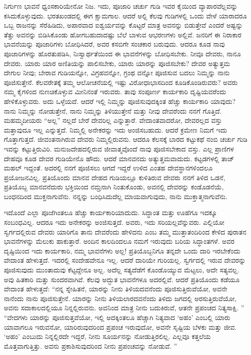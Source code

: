 ನಿರ್ಗುಣ ಭಾವನೆ ಧ್ವಂಸಕಾರಿಯೇನೋ ನಿಜ. ಇದು, ಪೂಜಾರಿ ಚರ್ಚು ಗುಡಿ ಇವರ ಕೈಯಿಂದ ವ್ಯಾಪಾರವೆಲ್ಲವನ್ನು ಕಸಿದುಕೊಳ್ಳುವುದು. ಭರತಖಂಡದಲ್ಲಿ ಈಗ ಕ್ಷಾಮಗಾಲ. ಆದರೆ ಅಲ್ಲಿ ಕೆಲವು ಗುಡಿಗಳಲ್ಲಿ ಒಂದು ವೇಳೆ ಯಾರಾದರೂ ಒಬ್ಬ ರಾಜನನ್ನು ಸೆರೆಹಿಡಿದು, ಅಪಾರವಾದ ಐಶ್ವರ್ಯವನ್ನು ಕೊಟ್ಟರೆ ಮಾತ್ರ ಅವನನ್ನು ಬಿಡುತ್ತೇವೆ ಎಂದರೆ ಅಷ್ಟನ್ನು ತೆತ್ತು ಅವನನ್ನು ಬಿಡಿಸಿಕೊಂಡು ಹೋಗಬಹುದಾದಷ್ಟು ಬೆಲೆ ಬಾಳುವ ಆಭರಣಗಳು ಅಲ್ಲಿವೆ. ಜನರಿಗೆ ಈ ನಿರಾಕಾರ ಭಾವನೆಯನ್ನು ಪೂಜಾರಿಗಳು ಬೋಧಿಸಿದರೆ, ಅವರ ಕಸಬಿಗೇ ಸಂಚಕಾರ ಬರುವುದು. ಆದರೂ ಕೂಡ ನಾವು ಪೂಜಾರಿಗಳನ್ನು ಹೊರತುಪಡಿಸಿ, ನಿಃಸ್ವಾರ್ಥತೆಯಿಂದ ಈ ಭಾವನೆಗಳನ್ನು ಬೋಧಿಸಬೇಕು. ನೀವೂ ದೇವರು, ನಾನೂ ದೇವರು. ಯಾರು ಯಾರ ಅಣಿತಿಯನ್ನು ಪಾಲಿಸಬೇಕು, ಯಾರು ಯಾರನ್ನು ಪೂಜಿಸಬೇಕು? ದೇವರ ಅತ್ಯುತ್ತಮ ದೇಗುಲ ನೀವು; ಬೇರಾವ ಗುಡಿಯನ್ನೋ, ವಿಗ್ರಹವನ್ನೋ, ಗ್ರಂಥ ವನ್ನೋ ಪೂಜಿಸುವ ಬದಲು ನಿಮ್ಮನ್ನು ನಾನು ಪೂಜಿಸುತ್ತೇನೆ. ಕೆಲವರೇತಕ್ಕೆ ತಮ್ಮ ಆಲೋಚನೆಯಲ್ಲಿ ಇಷ್ಟು ವಿರೋಧಾಭಾಸದಿಂದ ಕೂಡಿಕೊಂಡಿರುವರು? ಅವರು ನಮ್ಮ ಕೈಗಳಿಂದ ನುಣಚಿಕೊಳ್ಳುವ ಮೀನಿನಂತೆ ಇರುವರು. ತಾವು ಸಂಪೂರ್ಣ ಕಾರ್ಯಕಾರಿ ದೃಷ್ಟಿಯವರೆಂದು ಹೇಳಿಕೊಳ್ಳುವರು. ಅದು ಒಳ್ಳೆಯದೆ. ಆದರೆ ಇಲ್ಲಿ ನಿಮ್ಮನ್ನು ಪೂಜಿಸುವುದಕ್ಕಿಂತ ಹೆಚ್ಚು ಕಾರ್ಯಕಾರಿ ಯಾವುದು? ನಾನು ನಿಮ್ಮನ್ನು ನೋಡುತ್ತೇನೆ, ನಾನು ನಿಮ್ಮನ್ನು ತಿಳಿಯುತ್ತೇನೆ ಮತ್ತು ನೀವು ದೇವರೆಂದು ನನಗೆ ಗೊತ್ತಿದೆ. ಮಹಮ್ಮದೀಯರು “ಅಲ್ಲ” ನಲ್ಲದೆ ಬೇರೆ ದೇವರಿಲ್ಲ ಎನ್ನುತ್ತಾರೆ. ವೇದಾಂತವಾದರೋ, ದೇವರಲ್ಲದ ವಸ್ತು ಮತ್ತಾವುದೂ ಇಲ್ಲ ಎನ್ನುತ್ತದೆ. ನಿಮ್ಮಲ್ಲಿ ಅನೇಕರನ್ನು ಇದು ಅಂಜಿಸಬಹುದು. ಆದರೆ ಕ್ರಮೇಣ ನಿಮಗೆ ಇದು ಗೊತ್ತಾಗುತ್ತದೆ. ಜೀವಂತನಾಗಿರುವ ದೇವರು ನಿಮ್ಮಲ್ಲಿರುವನು. ಆದರೂ ಕೆಲಸಕ್ಕೆ ಬಾರದ ಕಟ್ಟುಕಥೆ ನಂಬಿ ಚರ್ಚು ಗುಡಿ ಇವನ್ನು ಕಟ್ಟುತ್ತಿರುವಿರಿ. ಮನುಜದೇಹದಲ್ಲಿರುವ ಜೀವಾತ್ಮವೊಂದೆ ನಾವು ಪೂಜಿಸಬೇಕಾದ ವಸ್ತು. ಎಲ್ಲ ಪ್ರಾಣಿಗಳ ದೇಹವೂ ಕೂಡ ದೇವರ ಗುಡಿಯೇನೊ ಹೌದು. ಆದರೆ ಮಾನವನದು ಅತ್ಯುತ್ತಮವಾದುದು. ಕಟ್ಟಡಗಳಲ್ಲಿ ತಾಜ್​ ಮಹಲ್​ ಇದ್ದಂತೆ. ಅದರಲ್ಲಿ ನನಗೆ ಪೂಜಿಸಲು ಆಗದೆ ಇದ್ದರೆ ಉಳಿದ ಎಂತಹ ದೇವಸ್ಥಾನಗಳಿಂದಲೂ ಪ್ರಯೋಜನವಿಲ್ಲ. ಪ್ರತಿಯೊಂದು ಮಾನವ ದೇಹದ ಗುಡಿಯಲ್ಲೂ ಕುಳಿತಿರುವ ದೇವರು ನನಗೆ ತಿಳಿದ ಒಡನೆ, ಪ್ರತಿಯೊಬ್ಬ ಮಾನವನೆದುರು ಭಕ್ತಿಯಿಂದ ನಮ್ರನಾಗಿ ನಿಂತುಕೊಂಡು, ಅವನಲ್ಲಿ ದೇವರನ್ನು ಕಂಡೊಡನೆಯೆ, ಬಂಧನದಿಂದ ಮುಕ್ತನಾಗುವೆನು. ನನ್ನನ್ನು ಬಂಧಿಸಿದುದೆಲ್ಲ ಮಾಯವಾಗುವುದು, ನಾನು ಮುಕ್ತಾತ್ಮನಾಗುವೆನು. 

\vskip 6pt

ಇದೊಂದೆ ಎಲ್ಲಾ ಪೂಜೆಗಿಂತಲೂ ಹೆಚ್ಚು ಕಾರ್ಯಕಾರಿಯಾದುದು. ಸಿದ್ಧಾಂತ ಮತ್ತು ಊಹೆಗೂ ಇದಕ್ಕೂ ಸಂಬಂಧವಿಲ್ಲ. ಆದರೂ ಇದು ಅನೇಕರನ್ನು ಅಂಜಿಸುತ್ತದೆ. ಅವರು, ಇದು ಸರಿಯಲ್ಲವೆನ್ನುವರು. ಎಲ್ಲಿಯೋ ಸ್ವರ್ಗದಲ್ಲಿರುವ ದೇವರು ಯಾರಿಗೊ ತಾನು ದೇವರೆಂದು ಹೇಳಿದನು ಎಂಬ ತಮ್ಮ ಮುತ್ತಾತಂದಿರಿಂದ ಕೇಳಿದ ಪುರಾತನ ಭಾವನೆಗಳನ್ನು ಮೆಲುಕು ಹಾಕುತ್ತಾರೆ. ಅಂದಿನ ಕಾಲದಿಂದಲೂ ನಮಗೆ ಇರುವುದು ಬರಿಯ ಸಿದ್ಧಾಂತಗಳೆ. ಅವರ ದೃಷ್ಟಿಯಿಂದ ಇದು ಕಾರ್ಯಕಾರಿ, ನಮ್ಮ ಭಾವನೆಗಳು ಅಲ್ಲ! ಪ್ರತಿಯೊಬ್ಬನಿಗೂ ತನ್ನದೇ ಒಂದು ದಾರಿ ಇರಬೇಕೆಂದು ವೇದಾಂತ ಹೇಳುತ್ತದೆ. ಇದರಲ್ಲಿ ಸಂದೇಹವೇನೂ ಇಲ್ಲ. ಆದರೆ ದಾರಿಯೇ ಗುರಿಯಲ್ಲ. ಸ್ವರ್ಗದಲ್ಲಿ ಇರುವ ದೇವರನ್ನು ಪೂಜಿಸುವುದು ಮುಂತಾದುವು ಕೆಟ್ಟದ್ದೇನೂ ಅಲ್ಲ. ಅದೆಲ್ಲ ಸತ್ಯದೆಡೆಗೆ ಕೊಂಡೊಯ್ಯುವ ಮೆಟ್ಟಲು, ಅದೇ ಸತ್ಯವಲ್ಲ. ಅವು ಹಿತಕಾರಿ ಮತ್ತು ಸುಂದರವಾಗಿವೆ. ಕೆಲವು ಅದ್ಭುತ ಭಾವನೆಗಳೂ ಅದರಲ್ಲಿವೆ. ಆದರೆ ಪ್ರತಿಯೊಂದು ಕಡೆಯೂ ವೇದಾಂತ ಹೇಳುತ್ತದೆ: “ನನ್ನ ಸ್ನೇಹಿತನೆ, ಯಾರನ್ನು ನೀನು ತಿಳಿಯದವನೆಂದು ಪೂಜಿಸುತ್ತಿರುವೆಯೋ, ಅವನೇ ನಾನೆಂದು ನಾನು ಪೂಜಿಸುತ್ತೇನೆ. ಯಾರನ್ನು ನೀನು ತಿಳಿಯಲಾರದವನೆಂದು ತಿಳಿದು ಜಗದಲ್ಲಿ ಅರಸುತ್ತಿರುವೆಯೋ, ಅವನು ಸದಾಕಾಲದಲ್ಲಿಯೂ ನಿನ್ನಲ್ಲಿರುವನು. ಅವನಿಂದ ಮಾತ್ರ ನೀನು ಬದುಕಿರುವೆ, ಆತನೇ ಪ್ರಪಂಚದ ನಿತ್ಯಸಾಕ್ಷಿ. ” “ವೇದಗಳು ಯಾರನ್ನು ಪೂಜಿಸುತ್ತವೆಯೋ, ಇಲ್ಲಿ ಅದಕ್ಕಿಂತಲೂ ಹೆಚ್ಚಾಗಿ ನಿತ್ಯವಾದ ‘ಅಹಂ’ ಎಂಬಲ್ಲಿ ಯಾರು ಯಾವಾಗಲೂ ಇರುವನೋ, ಯಾರಿರುವುದರಿಂದ ಪ್ರಪಂಚ ಇರುವುದೋ, ಅವನೇ ಸೃಷ್ಟಿಯ ಬೆಳಕು ಮತ್ತು ಜೀವ. ‘ಅಹಂ’ ಎಂಬುದು ನಿನ್ನಲ್ಲಿರದೇ ಇದ್ದರೆ, ನೀನು ಸೂರ್ಯನನ್ನು ನೋಡುತ್ತಿರಲಿಲ್ಲ. ಎಲ್ಲವೂ ಕತ್ತಲೆಯ ಮೊತ್ತವಾಗುತ್ತಿತ್ತು. ಅವನು ಪ್ರಕಾಶಿಸುವುದರಿಂದ ನೀನು ಪ್ರಪಂಚವನ್ನು ನೋಡುವೆ. ”


